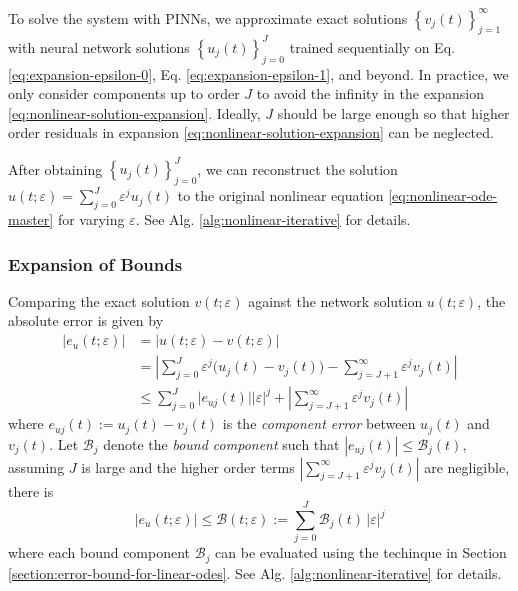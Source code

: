 \documentclass[accepted]{uai2023}
\newcommand{\Err}{e}
\newcommand{\Bound}{\mathcal{B}}
\begin{document}
    To solve the system with PINNs, we approximate exact solutions $\left\{v_j(t)\right\}_{j=1}^{\infty}$ with neural network solutions $\left\{u_j(t)\right\}_{j=0}^{J}$ trained sequentially on Eq. \ref{eq:expansion-epsilon-0}, Eq. \ref{eq:expansion-epsilon-1}, and beyond. 
    In practice, we only consider components up to order $J$ to avoid the infinity in the expansion \ref{eq:nonlinear-solution-expansion}. 
    Ideally, $J$ should be large enough so that higher order residuals in expansion \ref{eq:nonlinear-solution-expansion} can be neglected.

    After obtaining $\left\{u_j(t)\right\}_{j=0}^{J}$, we can reconstruct the solution $u(t;\varepsilon) = \sum_{j=0}^{J} \varepsilon^j u_j(t)$ to the original nonlinear equation \ref{eq:nonlinear-ode-master} for varying $\varepsilon$.
    See Alg. \ref{alg:nonlinear-iterative} for details.

\subsubsection{Expansion of Bounds}
    Comparing the exact solution $v(t; \varepsilon)$ against the network solution $u(t; \varepsilon)$, the absolute error is given by 
    {
        \small
        \begin{align}
            |\Err_u(t; \varepsilon)| &= \Big|u(t; \varepsilon) - v(t; \varepsilon)\Big| \nonumber \\
            &= \left|\sum_{j=0}^{J} \varepsilon^{j} \Big(u_j(t) - v_j(t)\Big) - \sum_{j=J+1}^{\infty} \varepsilon^j v_j(t)\right| \nonumber \\
            &\leq \sum_{j=0}^{J} \Big|\Err_{uj}(t)\Big||\varepsilon|^j + \left|\sum_{j=J+1}^{\infty}\varepsilon^j v_j(t)\right|
        \end{align}
    }
    where $\Err_{uj}(t) := u_j(t) - v_j(t)$ is the \textit{component error} between $u_j(t)$ and $v_j(t)$.
    Let $\Bound_{j}$ denote the \textit{bound component} such that $|\Err_{uj}(t)| \leq \Bound_j(t)$, assuming $J$ is large and the higher order terms $\left|\sum_{j=J+1}^{\infty}\varepsilon^j v_j(t)\right|$ are negligible, there is 
    {
        \small
        \begin{equation} \label{eq:nonlinear-bound-components}
            \Big|\Err_u(t; \varepsilon)\Big| \leq \Bound(t; \varepsilon) := \sum_{j=0}^{J} \Bound_j(t)\,|\varepsilon|^j 
        \end{equation}
    }
    where each bound component $\Bound_j$ can be evaluated using the techinque in Section \ref{section:error-bound-for-linear-odes}. 
    See Alg. \ref{alg:nonlinear-iterative} for details.
\end{document}
